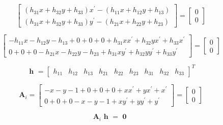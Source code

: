 \documentclass[12pt]{article}
\begin{document}
$$
\begin{bmatrix}
( h_{31} x + h_{32} y + h_{33} ) x^{ \prime } - ( h_{11} x + h_{12} y + h_{13} ) \\
( h_{31} x + h_{32} y + h_{33} ) y^{ \prime } - ( h_{21} x + h_{22} y + h_{23} )
\end{bmatrix}
=
\begin{bmatrix}
0 \\ 0
\end{bmatrix}
$$

$$
\begin{bmatrix}
- h_{11} x 
- h_{12} y 
- h_{13}
+ 0 + 0 + 0
+ h_{31} x  x^{ \prime }
+ h_{32} y  x^{ \prime }
+ h_{33} x^{ \prime }   \\
0 + 0 + 0
- h_{21} x 
- h_{22} y 
- h_{23}
+ h_{31} x y^{ \prime } 
+ h_{32} y y^{ \prime } 
+ h_{33}   y^{ \prime } 
\end{bmatrix}
=
\begin{bmatrix}
0 \\ 0
\end{bmatrix}
$$

$$
\textbf { h } = 
\begin{bmatrix}
h_{11} & h_{12} & h_{13} & h_{21} & h_{22} & h_{23} & h_{31} & h_{32} & h_{33} 
\end{bmatrix}^{T}
$$

$$
\textbf{A}_{i} = 
\begin{bmatrix}
- x 
- y 
- 1
+ 0 + 0 + 0
+ x  x^{ \prime }
+ y  x^{ \prime }
+ x^{ \prime }   \\
0 + 0 + 0
- x 
- y 
- 1
+ x y^{ \prime } 
+ y y^{ \prime } 
+   y^{ \prime } 
\end{bmatrix}
=
\begin{bmatrix}
0 \\ 0
\end{bmatrix}
$$

$$
\textbf{A}_{i} 
\textbf { h } =  \textbf { 0 }
$$
\end{document}
